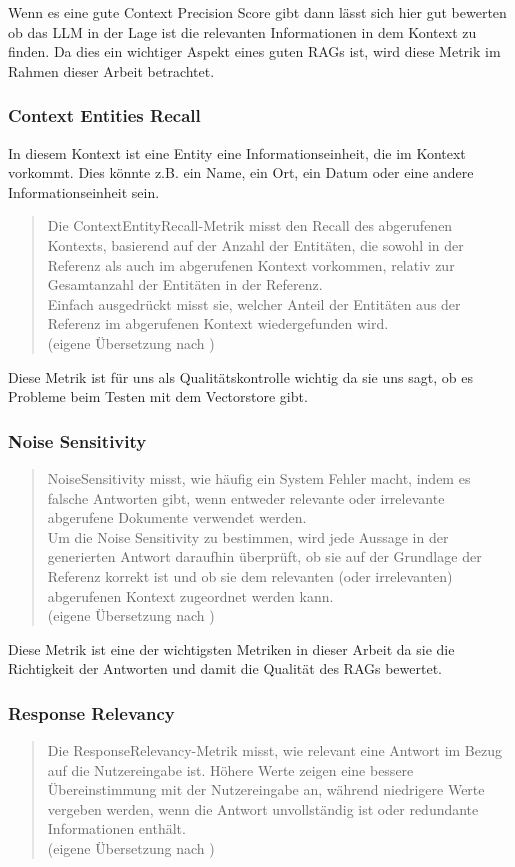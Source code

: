 Wenn es eine gute Context Precision Score gibt dann lässt sich hier gut bewerten ob das LLM in der Lage ist die relevanten Informationen in dem Kontext zu finden.
Da dies ein wichtiger Aspekt eines guten RAGs ist, wird diese Metrik im Rahmen dieser Arbeit betrachtet.

\subsubsection{Context Entities Recall}
In diesem Kontext ist eine Entity eine Informationseinheit, die im Kontext vorkommt.
Dies könnte z.B. ein Name, ein Ort, ein Datum oder eine andere Informationseinheit sein.

\begin{quote}
Die ContextEntityRecall-Metrik misst den Recall des abgerufenen Kontexts, basierend auf der Anzahl der Entitäten, die sowohl in der Referenz als auch im abgerufenen Kontext vorkommen, relativ zur Gesamtanzahl der Entitäten in der Referenz.\\
Einfach ausgedrückt misst sie, welcher Anteil der Entitäten aus der Referenz im abgerufenen Kontext wiedergefunden wird.\\
(eigene Übersetzung nach \cite{ragas_context_entities_recall})
\end{quote}
Diese Metrik ist für uns als Qualitätskontrolle wichtig da sie uns sagt, ob es Probleme beim Testen mit dem Vectorstore gibt.

\subsubsection{Noise Sensitivity}
\begin{quote}
NoiseSensitivity misst, wie häufig ein System Fehler macht, indem es falsche Antworten gibt, wenn entweder relevante oder irrelevante abgerufene Dokumente verwendet werden.\\
Um die Noise Sensitivity zu bestimmen, wird jede Aussage in der generierten Antwort daraufhin überprüft, ob sie auf der Grundlage der Referenz korrekt ist und ob sie dem relevanten (oder irrelevanten) abgerufenen Kontext zugeordnet werden kann.\\
(eigene Übersetzung nach \cite{ragas_noise_sensitivity})
\end{quote}
Diese Metrik ist eine der wichtigsten Metriken in dieser Arbeit da sie die Richtigkeit der Antworten und damit die Qualität des RAGs bewertet.

\subsubsection{Response Relevancy}
\begin{quote}
Die ResponseRelevancy-Metrik misst, wie relevant eine Antwort im Bezug auf die Nutzereingabe ist. Höhere Werte zeigen eine bessere Übereinstimmung mit der Nutzereingabe an, während niedrigere Werte vergeben werden, wenn die Antwort unvollständig ist oder redundante Informationen enthält.\\
(eigene Übersetzung nach \cite{ragas_response_relevancy})
\end{quote}

